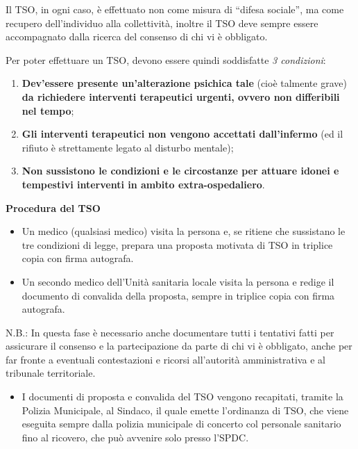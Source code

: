 \documentclass[]{article}
\begin{document}
Il TSO, in ogni caso, è effettuato non come misura di ``difesa
sociale'', ma come recupero dell'individuo alla collettività, inoltre il
TSO deve sempre essere accompagnato dalla ricerca del consenso di chi vi
è obbligato.

Per poter effettuare un TSO, devono essere quindi soddisfatte \emph{3
condizioni}:

\begin{enumerate}
\def\labelenumi{\arabic{enumi}.}
\item
  \textbf{Dev'essere presente un'alterazione psichica tale} (cioè
  talmente grave) \textbf{da richiedere interventi terapeutici urgenti,
  ovvero non differibili nel tempo};
\item
  \textbf{Gli interventi terapeutici non vengono accettati dall'infermo}
  (ed il rifiuto è strettamente legato al disturbo mentale);
\item
  \textbf{Non sussistono le condizioni e le circostanze per attuare
  idonei e tempestivi interventi in ambito extra-ospedaliero}.
\end{enumerate}

\textbf{Procedura del TSO}

\begin{itemize}
\item
  Un medico (qualsiasi medico) visita la persona e, se ritiene che
  sussistano le tre condizioni di legge, prepara una proposta motivata
  di TSO in triplice copia con firma autografa.
\item
  Un secondo medico dell'Unità sanitaria locale visita la persona e
  redige il documento di convalida della proposta, sempre in triplice
  copia con firma autografa.
\end{itemize}

N.B.: In questa fase è necessario anche documentare tutti i tentativi
fatti per assicurare il consenso e la partecipazione da parte di chi vi
è obbligato, anche per far fronte a eventuali contestazioni e ricorsi
all'autorità amministrativa e al tribunale territoriale.

\begin{itemize}
\item
  I documenti di proposta e convalida del TSO vengono recapitati,
  tramite la Polizia Municipale, al Sindaco, il quale emette l'ordinanza
  di TSO, che viene eseguita sempre dalla polizia municipale di concerto
  col personale sanitario fino al ricovero, che può avvenire solo presso
  l'SPDC.
\end{itemize}
\end{document}
